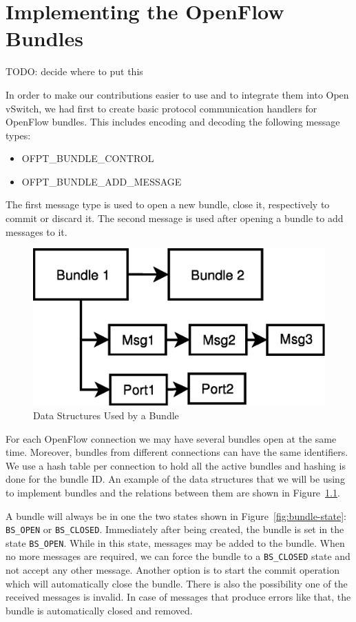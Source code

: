 \chapter{Implementing the OpenFlow Bundles}
\label{chapter:impl}  
 
TODO: decide where to put this

In order to make our contributions easier to use and to integrate them into Open vSwitch,
we had first to create basic protocol communication handlers for OpenFlow bundles. This
includes encoding and decoding the following message types:
\begin{itemize}
 \item OFPT_BUNDLE_CONTROL
 \item OFPT_BUNDLE_ADD_MESSAGE
\end{itemize}
The first message type is used to open a new bundle, close it, respectively to commit or discard it. The
second message is used after opening a bundle to add messages to it.

\begin{figure}[h]
\begin{center}
\includegraphics[scale=0.5]{src/img/bundle-content.eps}
\end{center}
\caption{Data Structures Used by a Bundle}
\label{fig:bundles}
\end{figure}

For each OpenFlow connection we may have several bundles open at the same time. Moreover, bundles from different connections
can have the same identifiers. We use a hash table per connection to hold all the active bundles and hashing is done for 
the bundle ID. An example of the data structures that we will be using to implement bundles and the relations between
them are shown in Figure~\ref{fig:bundles}.

A bundle will always be in one the two states shown in Figure~\ref{fig:bundle-state}: \texttt{BS_OPEN} or \texttt{BS_CLOSED}.
Immediately after being created, the bundle is set in the state \texttt{BS_OPEN}. While in this state, messages may be
added to the bundle. When no more messages are required, we can force the bundle to a \texttt{BS_CLOSED} state and not
accept any other message. Another option is to start the commit operation which will automatically close the bundle.
There is also the possibility one of the received messages is invalid. In case of messages that produce errors like that,
the bundle is automatically closed and removed.

